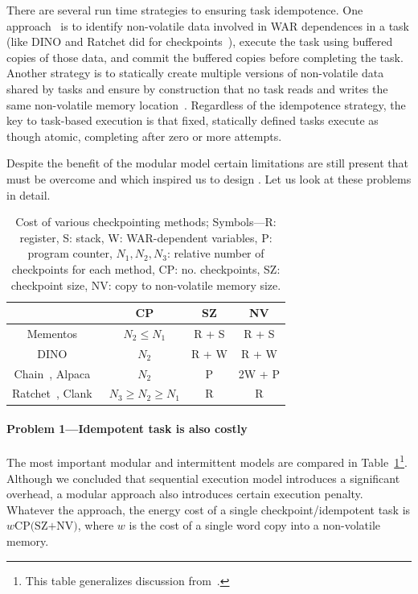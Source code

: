 There are several run time strategies to ensuring task idempotence. One
approach~\cite{alpaca} is to identify non-volatile data involved in WAR
dependences in a task (like DINO and Ratchet did for
checkpoints~\cite{dino,ratchet}), execute the task using buffered copies of
those data, and commit the buffered copies before completing the task. Another
strategy is to statically create multiple versions of non-volatile data shared
by tasks and ensure by construction that no task reads and writes the same
non-volatile memory location~\cite{chain}.  Regardless of the idempotence
strategy, the key to task-based execution is that fixed, statically defined
tasks execute as though atomic, completing after zero or more attempts. 


Despite the benefit of the modular model certain limitations are still present that must be overcome and which inspired us to design \sys. Let us look at these problems in detail.

\begin{table}
	\centering
	\footnotesize
	\begin{tabular}{|c|c|c|c|}
		\hline
		{~} & CP & SZ & NV \\
		\hline\hline
		\!\!Mementos~\cite{mementos}\!\! & \!\!$N_2\leq N_1$\!\! & \!\!R + S\!\! & \!\!R + S\!\! \\
		\!\!DINO~\cite{dino}\!\! & $N_2$\!\! & \!\!R + W\!\! & \!\!R + W\!\! \\
		\!\!Chain~\cite{chain}, Alpaca~\cite{alpaca}\!\! & \!\!$N_2$\!\! & P\!\! & \!\!2W + P\!\!\\
		\!\!Ratchet~\cite{ratchet}, Clank~\cite{hicks_isca_2017}\!\! & $N_3\geq N_2\geq N_1$\!\! & \!\!R\!\! & R\!\!\\
		\hline 
	\end{tabular}
	\caption{Cost of various checkpointing methods; Symbols---R: register, S: stack, W: WAR-dependent variables, P: program counter, $N_1, N_2, N_3$: relative number of checkpoints for each method, CP: no. checkpoints, SZ: checkpoint size, NV: copy to non-volatile memory size.}
	\label{table:chechpoint_comparison}
\end{table}

\paragraph{Problem 1---Idempotent task is also costly}

The most important modular and intermittent models are compared in Table~\ref{table:chechpoint_comparison}\footnote{This table generalizes discussion from~\cite[Sec. 2.4]{alpaca}.}. Although we concluded that sequential execution model introduces a significant overhead, a modular approach also introduces certain execution penalty. Whatever the approach, the energy cost of a single checkpoint/idempotent task is $w\text{CP(SZ+NV)}$, where $w$ is the cost of a single word copy into a non-volatile memory. 

